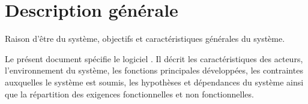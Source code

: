 \newpage
\section{Description générale} %

\complete Raison d'être du système, objectifs et caractéristiques générales du système.

Le présent document spécifie le logiciel \complete. Il décrit les caractéristiques des acteurs, l'environnement du système, les fonctions principales développées, les contraintes auxquelles le système est soumis, les hypothèses et dépendances du système ainsi que la répartition des exigences fonctionnelles et non fonctionnelles.












